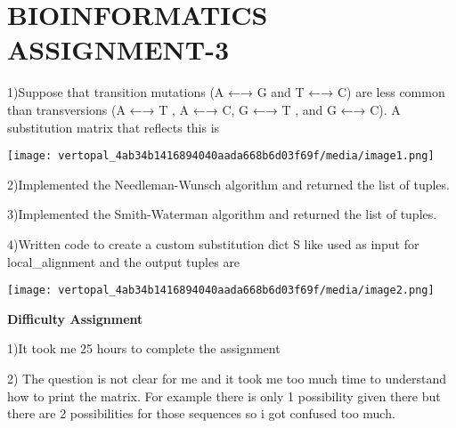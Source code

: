 \documentclass[
]{article}
\author{}
\date{}
\begin{document}
\hypertarget{bioinformatics-assignment-3}{%
\section{\texorpdfstring{ BIOINFORMATICS
ASSIGNMENT-3}{ BIOINFORMATICS ASSIGNMENT-3}}\label{bioinformatics-assignment-3}}

1)Suppose that transition mutations (A ←→ G and T ←→ C) are less common
than transversions (A ←→ T , A ←→ C, G ←→ T , and G ←→ C). A
substitution matrix that reflects this is

\texttt{[image: vertopal\_4ab34b1416894040aada668b6d03f69f/media/image1.png]}

2)Implemented the Needleman-Wunsch algorithm and returned the list of
tuples.

3)Implemented the Smith-Waterman algorithm and returned the list of
tuples.

4)Written code to create a custom substitution dict S like used as input
for local\_alignment and the output tuples are

\texttt{[image: vertopal\_4ab34b1416894040aada668b6d03f69f/media/image2.png]}

\textbf{Difficulty Assignment}

1)It took me 25 hours to complete the assignment

2) The question is not clear for me and it took me too much time to
understand how to print the matrix. For example there is only 1
possibility given there but there are 2 possibilities for those
sequences so i got confused too much.
\end{document}
